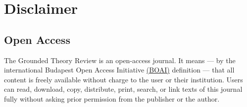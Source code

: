 \thispagestyle{plain}

\chapter*{Disclaimer}

\section*{Open Access}

The Grounded Theory Review is an open-access journal.
It means 
--- by the international Budapest Open Access Initiative 
\href{https://www.budapestopenaccessinitiative.org/}{(BOAI)}
definition --- that all content is freely available without charge to the user or their institution.
Users can read, download, copy, distribute, print, search, or link texts of this journal fully without asking prior permission from the publisher or the author.


